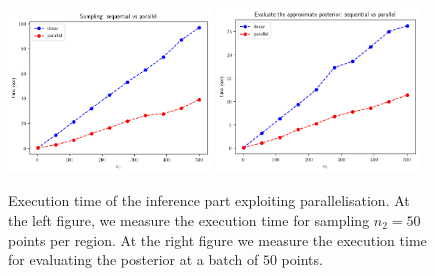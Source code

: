 \begin{figure}[ht]
    \begin{center}
      \includegraphics[width=0.48\textwidth]{./Thesis/images/chapter4/sample_parallel.png}
      \includegraphics[width=0.48\textwidth]{./Thesis/images/chapter4/eval_post_parallel.png}
    \end{center}
    \caption[Execution time of the inference part exploiting parallelisation.]{Execution
      time of the inference part exploiting parallelisation. At the left figure, we measure
      the execution time for sampling $n_2=50$ points per region. At the right figure we measure the execution time for evaluating the posterior at a batch of $50$ points.}
  \label{fig:exec_parallel2}
\end{figure}